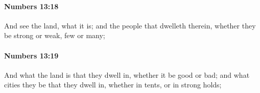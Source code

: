 		\paragraph{Numbers 13:18} %
			\label{NUMBERS-13-18}

			And see the land, what it is; and the people that dwelleth therein, whether they be strong or weak, few or many;


		\paragraph{Numbers 13:19} %
			\label{NUMBERS-13-19}

			And what the land is that they dwell in, whether it be good or bad; and what cities they be that they dwell in, whether in tents, or in strong holds;


